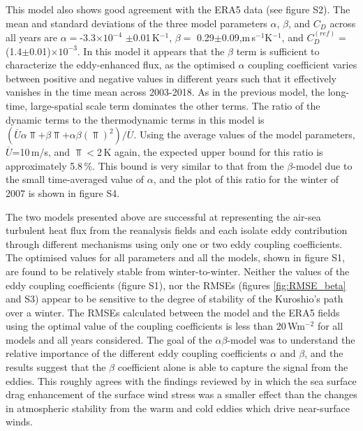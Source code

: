 This model also shows good agreement with the ERA5 data (see figure S2). The mean and standard deviations of the three model parameters $\alpha$, $\beta$, and $C_D$ across all years are $\alpha = $-3.3$\times10^{-4}$ $\pm$0.01\,K$^{-1}$, $\beta =$ 0.29$\pm$0.09,m\,s$^{-1}$K$^{-1}$, and $C_D^{(ref)} =$ (1.4$\pm$0.01)$\times10^{-3}$. In this model it appears that the $\beta$ term is sufficient to characterize the eddy-enhanced flux, as the optimised $\alpha$ coupling coefficient varies between positive and negative values in different years such that it effectively vanishes in the time mean across 2003-2018. As in the previous model, the long-time, large-spatial scale term dominates the other terms. The ratio of the dynamic terms to the thermodynamic terms in this model is $\left(\overline{U}\alpha \Top+\beta \Top + \alpha\beta \left(\Top\right)^2\right)/\overline{U}$. Using the average values of the model parameters, $\overline{U}$=10\,m/s, and $\Top<$2\,K again, the expected upper bound for this ratio is approximately 5.8\,\%. This bound is very similar to that from the $\beta$-model due to the small time-averaged value of $\alpha$, and the plot of this ratio for the winter of 2007 is shown in figure S4. \par 





The two models presented above are successful at representing the air-sea turbulent heat flux from the reanalysis fields and each isolate eddy contribution through different mechanisms using only one or two eddy coupling coefficients. The optimised values for all parameters and all the models, shown in figure S1, are found to be relatively stable from winter-to-winter. Neither the values of the eddy coupling coefficients (figure S1), nor the RMSEs (figures \ref{fig:RMSE_beta} and S3) appear to be sensitive to the degree of stability of the Kuroshio's path over a winter. The RMSEs calculated between the model and the ERA5 fields using the optimal value of the coupling coefficients is less than 20\,Wm$^{-2}$ for all models and all years considered. The goal of the $\alpha\beta$-model was to understand the relative importance of the different eddy coupling coefficients $\alpha$ and $\beta$, and the results suggest that the $\beta$ coefficient alone is able to capture the signal from the eddies. This roughly agrees with the findings reviewed by \citet{SMALL2008274} in which the sea surface drag enhancement of the surface wind stress was a smaller effect than the changes in atmospheric stability from the warm and cold eddies which drive near-surface winds. \par 



